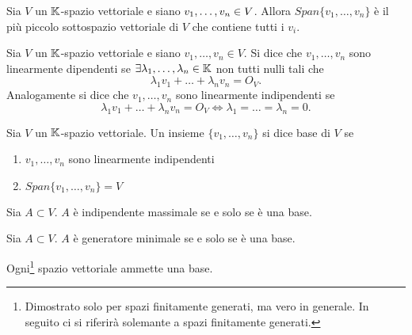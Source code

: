 \begin{thm}
	Sia $ V $ un $ \mathbb{K} $-spazio vettoriale e siano $ v_1, \ldots , v_n \in \nolinebreak V $. 
	Allora $ Span\{v_1, \ldots , v_n\} $ è il più piccolo sottospazio vettoriale di $ V $ 
	che contiene tutti i $ v_i $.
\end{thm}

\begin{definition} 
	Sia $ V $ un $ \mathbb{K} $-spazio vettoriale e siano $ v_1, \ldots , v_n \in V $. Si dice che $ v_1, \ldots, v_n $ 
	sono linearmente dipendenti se $ \exists \lambda_1, \ldots , \lambda_n \in \mathbb{K} $ non tutti nulli tali che 
	\[\lambda_1 v_1 + \ldots + \lambda_n v_n = O_V.\] Analogamente si dice che $ v_1, \ldots, v_n $ sono linearmente 
	indipendenti se \[\lambda_1 v_1 + \ldots + \lambda_n v_n = O_V \iff \lambda_1 = \ldots = \lambda_n = 0.\]	
\end{definition}

\begin{definition}[Base]
	Sia $ V $ un $ \mathbb{K} $-spazio vettoriale. Un insieme $ \{v_1, \ldots, v_n\} $ si dice base di $ V $ se
	\begin{enumerate}[label=(\roman*)]
		\item $ v_1, \ldots, v_n $ sono linearmente indipendenti
		\item $ Span\{v_1, \ldots , v_n\} = V $
	\end{enumerate}
\end{definition}


\begin{lemma}
	Sia $A \subset V$. $A$ è indipendente massimale se e solo se è una base. 
\end{lemma}

\begin{lemma}
        Sia $A \subset V$. $A$ è generatore minimale se e solo se è una base.
\end{lemma}

\begin{thm}
	Ogni\footnote{Dimostrato solo per spazi finitamente generati, ma vero in generale. In seguito ci si riferirà solemante a spazi finitamente generati.} 
	spazio vettoriale ammette una base.
\end{thm}

